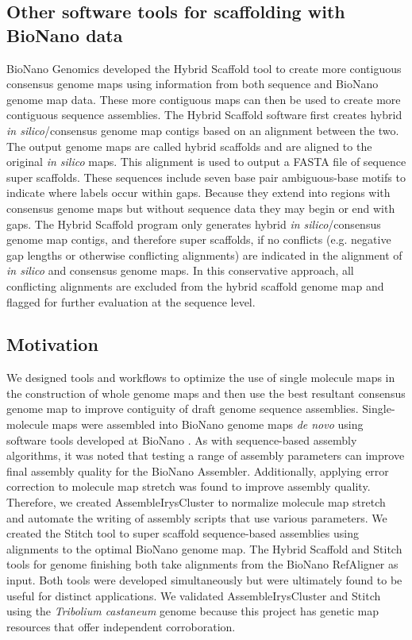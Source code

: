 \documentclass{bmcart}
\begin{document}
\subsection*{Other software tools for scaffolding with BioNano data}
BioNano Genomics developed the Hybrid Scaffold tool to create more contiguous consensus genome maps using information from both sequence and BioNano genome map data. These more contiguous maps can then be used to create more contiguous sequence assemblies. The Hybrid Scaffold software first creates hybrid \textit{in silico}/consensus genome map contigs based on an alignment between the two. The output genome maps are called hybrid scaffolds and are aligned to the original \textit{in silico} maps. This alignment is used to output a FASTA file of sequence super scaffolds. These sequences include seven base pair ambiguous-base motifs to indicate where labels occur within gaps. Because they extend into regions with consensus genome maps but without sequence data they may begin or end with gaps. The Hybrid Scaffold program only generates hybrid \textit{in silico}/consensus genome map contigs, and therefore super scaffolds, if no conflicts (e.g. negative gap lengths or otherwise conflicting alignments) are indicated in the alignment of \textit{in silico} and consensus genome maps. In this conservative approach, all conflicting alignments are excluded from the hybrid scaffold genome map and flagged for further evaluation at the sequence level.

\subsection*{Motivation}
We designed tools and workflows to optimize the use of single molecule maps in the construction of whole genome maps and then use the best resultant consensus genome map to improve contiguity of draft genome sequence assemblies. Single-molecule maps were assembled into BioNano genome maps \textit{de novo} using software tools developed at BioNano \cite{BioNanoSV2014}. As with sequence-based assembly algorithms, it was noted that testing a range of assembly parameters can improve final assembly quality for the BioNano Assembler. Additionally, applying error correction to molecule map stretch was found to improve assembly quality. Therefore, we created AssembleIrysCluster to normalize molecule map stretch and automate the writing of assembly scripts that use various parameters. We created the Stitch tool to super scaffold sequence-based assemblies using alignments to the optimal BioNano genome map. The Hybrid Scaffold and Stitch tools for genome finishing both take alignments from the BioNano RefAligner as input. Both tools were developed simultaneously but were ultimately found to be useful for distinct applications. We validated AssembleIrysCluster and Stitch using the \textit{Tribolium castaneum} genome \cite{Beetle2008} because this project has genetic map resources \cite{BeetleGenMap2005} that offer independent corroboration.
\end{document}
